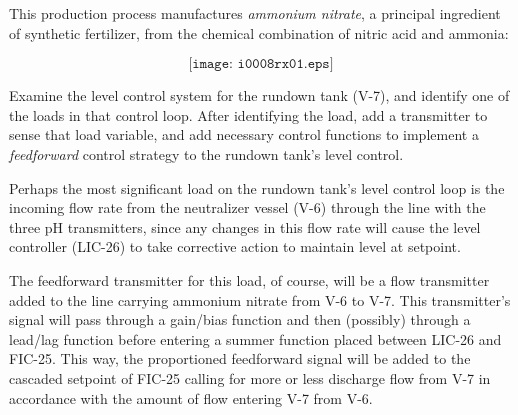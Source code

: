 

This production process manufactures {\it ammonium nitrate}, a principal ingredient of synthetic fertilizer, from the chemical combination of nitric acid and ammonia:

$$\texttt{[image: i0008rx01.eps]}$$

Examine the level control system for the rundown tank (V-7), and identify one of the loads in that control loop.  After identifying the load, add a transmitter to sense that load variable, and add necessary control functions to implement a {\it feedforward} control strategy to the rundown tank's level control.







Perhaps the most significant load on the rundown tank's level control loop is the incoming flow rate from the neutralizer vessel (V-6) through the line with the three pH transmitters, since any changes in this flow rate will cause the level controller (LIC-26) to take corrective action to maintain level at setpoint.

\vskip 10pt

The feedforward transmitter for this load, of course, will be a flow transmitter added to the line carrying ammonium nitrate from V-6 to V-7.  This transmitter's signal will pass through a gain/bias function and then (possibly) through a lead/lag function before entering a summer function placed between LIC-26 and FIC-25.  This way, the proportioned feedforward signal will be added to the cascaded setpoint of FIC-25 calling for more or less discharge flow from V-7 in accordance with the amount of flow entering V-7 from V-6.
 










